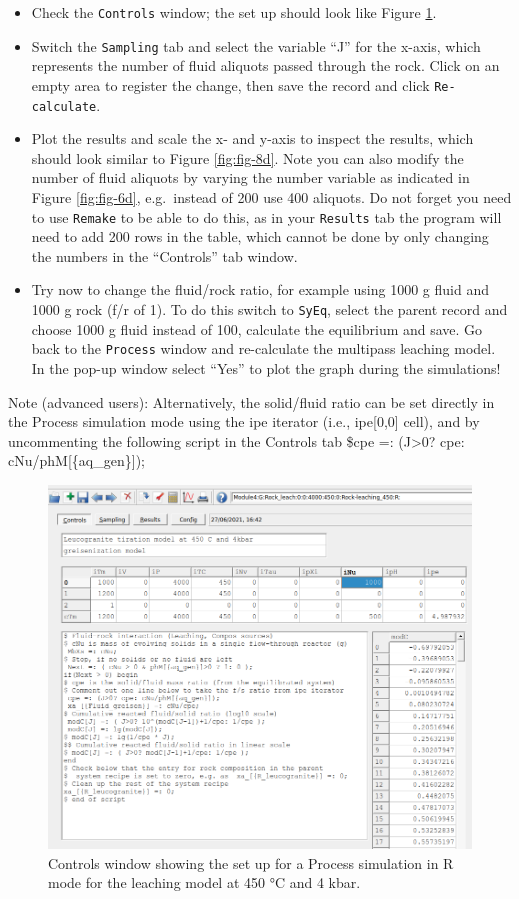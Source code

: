 \documentclass[
]{book}
\begin{document}
\begin{itemize}
\item
  Check the \texttt{Controls} window; the set up should look like Figure \ref{fig:fig-7d}.
\item
  Switch the \texttt{Sampling} tab and select the variable ``J'' for the x-axis, which represents the number of fluid aliquots passed through the rock. Click on an empty area to register the change, then save the record and click \texttt{Re-calculate}.
\item
  Plot the results and scale the x- and y-axis to inspect the results, which should look similar to Figure \ref{fig:fig-8d}. Note you can also modify the number of fluid aliquots by varying the number variable as indicated in Figure \ref{fig:fig-6d}, e.g.~instead of 200 use 400 aliquots. Do not forget you need to use \texttt{Remake} to be able to do this, as in your \texttt{Results} tab the program will need to add 200 rows in the table, which cannot be done by only changing the numbers in the ``Controls'' tab window.
\item
  Try now to change the fluid/rock ratio, for example using 1000 g fluid and 1000 g rock (f/r of 1). To do this switch to \texttt{SyEq}, select the parent record and choose 1000 g fluid instead of 100, calculate the equilibrium and save. Go back to the \texttt{Process} window and re-calculate the multipass leaching model. In the pop-up window select ``Yes'' to plot the graph during the simulations!
\end{itemize}

Note (advanced users): Alternatively, the solid/fluid ratio can be set directly in the Process simulation mode using the ipe iterator (i.e., ipe{[}0,0{]} cell), and by uncommenting the following script in the Controls tab \$cpe =: (J\textgreater0? cpe: cNu/phM{[}\{aq\_gen\}{]});

\begin{figure}
\includegraphics[width=1\linewidth]{figures/module4/fig-7} \caption{Controls window showing the set up for a Process simulation in R mode for the leaching model at 450 °C and 4 kbar.}\label{fig:fig-7d}
\end{figure}
\end{document}
